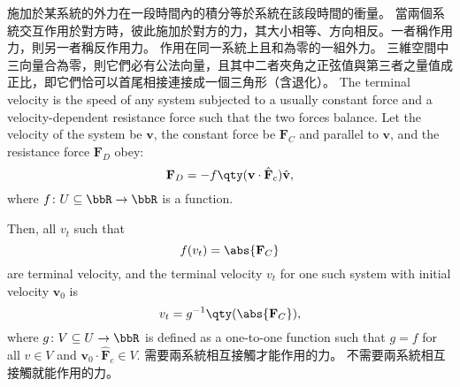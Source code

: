 \documentclass[a4paper,12pt]{article}
\begin{document}
施加於某系統的外力在一段時間內的積分等於系統在該段時間的衝量。
當兩個系統交互作用於對方時，彼此施加於對方的力，其大小相等、方向相反。一者稱作用力，則另一者稱反作用力。
作用在同一系統上且和為零的一組外力。
三維空間中三向量合為零，則它們必有公法向量，且其中二者夾角之正弦值與第三者之量值成正比，即它們恰可以首尾相接連接成一個三角形（含退化）。
The terminal velocity is the speed of any system subjected to a usually constant force and a velocity-dependent resistance force such that the two forces balance. Let the velocity of the system be $\mathbf{v}$, the constant force be $\mathbf{F}_C$ and parallel to $\mathbf{v}$, and the resistance force $\mathbf{F}_D$ obey:
\[\mathbf{F}_D=-f\qty(\mathbf{v}\cdot\hat{\mathbf{F}}_c)\hat{\mathbf{v}},\]
where $f\colon U\subseteq\bbR\to\bbR$ is a function.

Then, all $v_t$ such that
\[f(v_t)=\abs{\mathbf{F}_C}\]
are terminal velocity, and the terminal velocity $v_t$ for one such system with initial velocity $\mathbf{v}_0$ is
\[v_t=g^{-1}\qty(\abs{\mathbf{F}_C}),\]
where $g\colon V\subseteq U\to\bbR$ is defined as a one-to-one function such that $g=f$ for all $v\in V$ and $\mathbf{v}_0\cdot\hat{\mathbf{F}}_c\in V$.
需要兩系統相互接觸才能作用的力。
不需要兩系統相互接觸就能作用的力。
\end{document}
